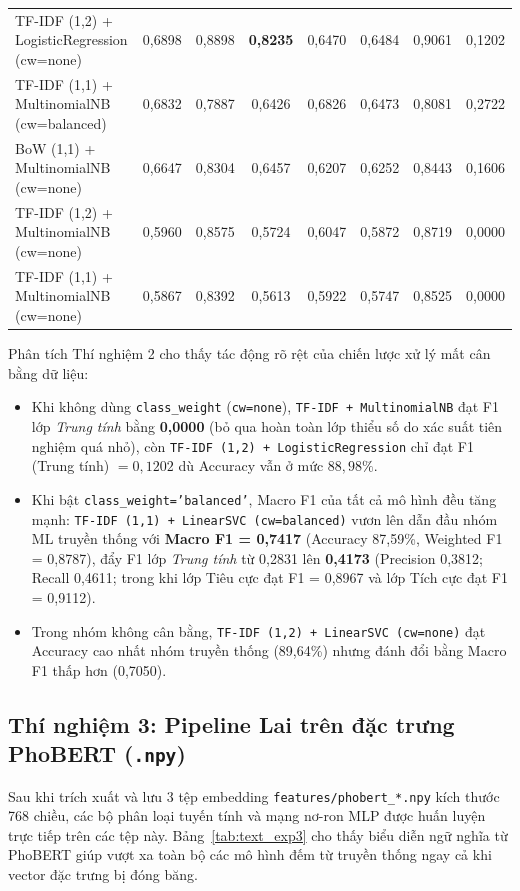 \documentclass[12pt,a4paper]{article}
\begin{document}
\begin{table}[htbp]
{\begin{tabular}{|l|c|c|c|c|c|c|c|}
TF-IDF (1,2) + LogisticRegression (cw=none)     & 0,6898 & 0,8898 & \textbf{0,8235} & 0,6470 & 0,6484 & 0,9061 & 0,1202 \\
TF-IDF (1,1) + MultinomialNB (cw=balanced)      & 0,6832 & 0,7887 & 0,6426 & 0,6826 & 0,6473 & 0,8081 & 0,2722 \\
BoW (1,1) + MultinomialNB (cw=none)             & 0,6647 & 0,8304 & 0,6457 & 0,6207 & 0,6252 & 0,8443 & 0,1606 \\
TF-IDF (1,2) + MultinomialNB (cw=none)          & 0,5960 & 0,8575 & 0,5724 & 0,6047 & 0,5872 & 0,8719 & 0,0000 \\
TF-IDF (1,1) + MultinomialNB (cw=none)          & 0,5867 & 0,8392 & 0,5613 & 0,5922 & 0,5747 & 0,8525 & 0,0000 \\
\hline
\end{tabular}%
}
\end{table}

Phân tích Thí nghiệm 2 cho thấy tác động rõ rệt của chiến lược xử lý mất cân bằng dữ liệu:
\begin{itemize}
    \item Khi không dùng \texttt{class\_weight} (\texttt{cw=none}), \texttt{TF-IDF + MultinomialNB} đạt F1 lớp \textit{Trung tính} bằng \textbf{0,0000} (bỏ qua hoàn toàn lớp thiểu số do xác suất tiên nghiệm quá nhỏ), còn \texttt{TF-IDF (1,2) + LogisticRegression} chỉ đạt F1 (Trung tính) $= 0{,}1202$ dù Accuracy vẫn ở mức $88{,}98\%$.
    \item Khi bật \texttt{class\_weight='balanced'}, Macro F1 của tất cả mô hình đều tăng mạnh: \texttt{TF-IDF (1,1) + LinearSVC (cw=balanced)} vươn lên dẫn đầu nhóm ML truyền thống với \textbf{Macro F1 = 0,7417} (Accuracy 87,59\%, Weighted F1 = 0,8787), đẩy F1 lớp \textit{Trung tính} từ 0,2831 lên \textbf{0,4173} (Precision 0,3812; Recall 0,4611; trong khi lớp Tiêu cực đạt F1 = 0,8967 và lớp Tích cực đạt F1 = 0,9112).
    \item Trong nhóm không cân bằng, \texttt{TF-IDF (1,2) + LinearSVC (cw=none)} đạt Accuracy cao nhất nhóm truyền thống (89,64\%) nhưng đánh đổi bằng Macro F1 thấp hơn (0,7050).
\end{itemize}

\subsection{Thí nghiệm 3: Pipeline Lai trên đặc trưng PhoBERT (\texttt{.npy})}
Sau khi trích xuất và lưu 3 tệp embedding \texttt{features/phobert\_*.npy} kích thước 768 chiều, các bộ phân loại tuyến tính và mạng nơ-ron MLP được huấn luyện trực tiếp trên các tệp này. Bảng~\ref{tab:text_exp3} cho thấy biểu diễn ngữ nghĩa từ PhoBERT giúp vượt xa toàn bộ các mô hình đếm từ truyền thống ngay cả khi vector đặc trưng bị đóng băng.
\end{document}
